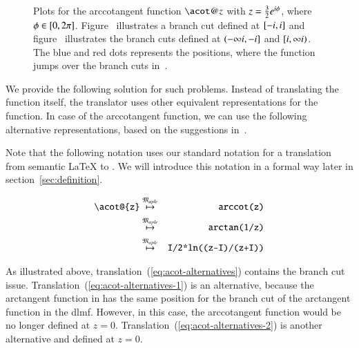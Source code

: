 \begin{figure}[!ht]
    \centering
    \hspace{0.2cm}
    \caption{Plots for the arccotangent function $\acot@{z}$ with $z = \frac{3}{2}{e}^{{i}\phi}$, where $\phi \in [0,2{\pi}]$. Figure~\protect{} illustrates a branch cut defined at $[-{i}, {i}]$ and figure~\protect{} illustrates the branch cuts defined at $(-\infty{i}, -{i}]$ and $[{i}, \infty{i})$. The blue and red dots represents the positions, where the function jumps over the branch cuts in~\protect{}.}
    \label{fig:acot}
\end{figure}

We provide the following solution for such problems. Instead of translating the function itself, the translator uses other equivalent representations for the function. In case of the arccotangent function, we can use the following alternative representations, based on the suggestions in~\cite{Branches:acot}.

Note that the following notation uses our standard notation for a translation from semantic \LaTeX{} to \Maple. We will introduce this notation in a formal way later in section~\ref{sec:definition}.

\begin{eqnarray}
\verb|\acot@{z}| & \overset{\langMaple}{\mapsto} & \verb|arccot(z)|\label{eq:acot-alternatives}\\
& \overset{\langMaple}{\mapsto} & \verb|arctan(1/z)|\label{eq:acot-alternatives-1}\\
& \overset{\langMaple}{\mapsto} & \verb|I/2*ln((z-I)/(z+I))|\label{eq:acot-alternatives-2}
\end{eqnarray}

As illustrated above, translation~(\ref{eq:acot-alternatives}) contains the branch cut issue. Translation~(\ref{eq:acot-alternatives-1}) is an alternative, because the arctangent function in \Maple{} has the same position for the branch cut of the arctangent function in the \gls{dlmf}. However, in this case, the arccotangent function would be no longer defined at $z=0$. Translation~(\ref{eq:acot-alternatives-2}) is another alternative and defined at $z=0$. 

